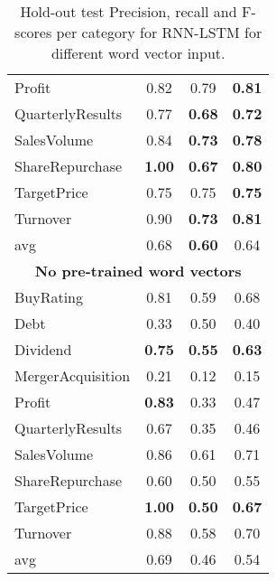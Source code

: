 \documentclass[11pt,a4paper]{article}
\begin{document}
\begin{table}[ht!]
{\begin{tabular}{p{2.8cm} c c c}
			Profit               & 0.82               & 0.79            & \textbf{0.81}        \\
			QuarterlyResults     & 0.77               & \textbf{0.68}   & \textbf{0.72}        \\
			SalesVolume          & 0.84               & \textbf{0.73}   & \textbf{0.78}        \\
			ShareRepurchase      & \textbf{1.00}      & \textbf{0.67}   & \textbf{0.80}        \\
			TargetPrice          & 0.75               & 0.75            & \textbf{0.75}        \\
			Turnover             & 0.90               & \textbf{0.73}   & \textbf{0.81}        \\
			\hline
			avg                  & 0.68               & \textbf{0.60}   & 0.64                 \\
			\hline \hline
			\multicolumn{4}{c}{\textbf{No pre-trained word vectors} } \\
			\hline
			BuyRating            & 0.81               & 0.59            & 0.68                 \\
			Debt                 & 0.33               & 0.50            & 0.40                 \\
			Dividend             & \textbf{0.75}      & \textbf{0.55}   & \textbf{0.63}        \\
			MergerAcquisition    & 0.21               & 0.12            & 0.15                 \\
			Profit               & \textbf{0.83}      & 0.33            & 0.47                 \\
			QuarterlyResults     & 0.67               & 0.35            & 0.46                 \\
			SalesVolume          & 0.86               & 0.61            & 0.71                 \\
			ShareRepurchase      & 0.60               & 0.50            & 0.55                 \\
			TargetPrice          & \textbf{1.00}      & \textbf{0.50}   & \textbf{0.67}        \\
			Turnover             & 0.88               & 0.58            & 0.70                 \\
			\hline
			avg                  & 0.69               & 0.46            & 0.54                 \\
			\hline
		\end{tabular}
		\caption{Hold-out test Precision, recall and F-scores per category for RNN-LSTM for different word vector input.}
		\label{resultsrnnlstm}
	}
\end{table}
\end{document}
